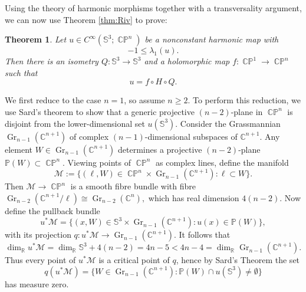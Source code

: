 \documentclass[11pt]{article}
\theoremstyle{plain}
\numberwithin{equation}{section}
\newtheorem{theorem}{Theorem}[section]
\theoremstyle{definition}
\let\oldendproof\endproof
\renewenvironment{proof}[1][\proofname]{%
\oldproof[\upshape \bfseries #1]%
}{\oldendproof}
\def \R {\mathbb{R}}
\def \C{\mathbb{C}}
\def \mc{\mathcal}
\def \mb{\mathbb}
\DeclareMathOperator{\CP}{\mathbb{CP}}
\begin{document}
Using the theory of harmonic morphisms together with a transversality argument, we can now use Theorem \ref{thm:Riv} to prove:

\begin{theorem}
    \label{thm:HopfFactorizationCPn}
Let $u\in C^\infty(\mb S^3;\CP^n)$ be a nonconstant harmonic map with
$$-1 \leq \lambda_1(u).$$  Then there is an
isometry $Q\colon\mb S^3\to\mb S^3$ and a holomorphic map
$f\colon\CP^1\to\CP^n$ such that
\begin{equation}
    \label{eq:HopfFactorizationCPn}
    u=f\circ H\circ Q.
\end{equation}
\end{theorem}

\begin{proof}
We first reduce to the case $n=1$, so assume $n\geq2$.  To perform this
reduction, we use Sard's theorem to show that a generic projective
$(n-2)$-plane in $\CP^n$ is disjoint from the lower-dimensional set
$u(\mb S^3)$.  Consider the Grassmannian
$\operatorname{Gr}_{n-1}(\C^{n+1})$ of complex $(n-1)$-dimensional
subspaces of $\C^{n+1}$.  Any element
$W\in\operatorname{Gr}_{n-1}(\C^{n+1})$ determines a projective $(n-2)$-plane
$\mathbb P(W)\subset\CP^n$.  Viewing points of $\CP^n$ as complex lines,
define the manifold
\[
    \mc M:=\{(\ell,W)\in\CP^n\times
    \operatorname{Gr}_{n-1}(\C^{n+1}):\ell\subset W\}.
\]
Then $\mc M\to\CP^n$ is a smooth fibre bundle with fibre
$    \operatorname{Gr}_{n-2}(\C^{n+1}/\ell)
    \cong \operatorname{Gr}_{n-2}(\C^n),$ which has real dimension $4(n-2)$.
Now define the pullback bundle
\[
	u^*\mc M
    =\{(x,W)\in\mb S^3\times\operatorname{Gr}_{n-1}(\C^{n+1}):
    u(x)\in\mathbb P(W)\},
\]
with its projection
$q\colon u^* \mc M\to\operatorname{Gr}_{n-1}(\C^{n+1})$.
 It follows that
\[
    \dim_\R u^* \mc M
    =\dim_\R\mb S^3+4(n-2)
   =4n-5<4n-4=\dim_\R\operatorname{Gr}_{n-1}(\C^{n+1}).
\]
Thus every point of $u^* \mc M$ is a critical point of $q$, hence by Sard's Theorem the set
$$q(u^* \mc M)=\{W\in\operatorname{Gr}_{n-1}(\C^{n+1}):
\mb P(W)\cap u(\mb S^3)\neq \emptyset\}$$
has measure zero.


\end{proof}
\end{document}
